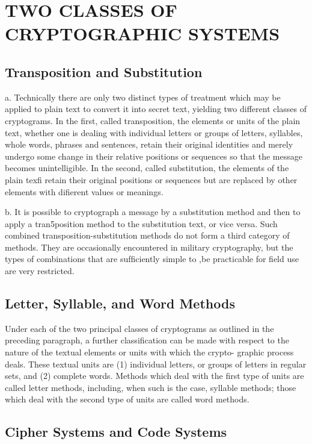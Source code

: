 \section{TWO CLASSES OF CRYPTOGRAPHIC SYSTEMS}

\subsection{Transposition and Substitution}

a. Technically there are only two distinct types of treatment which
may be applied to plain text to convert it into secret text, yielding two
different classes of cryptograms. In the ﬁrst, called transposition, the
elements or units of the plain text, whether one is dealing with individual
letters or groups of letters, syllables, whole words, phrases and sentences,
retain their original identities and merely undergo some change in their
relative positions or sequences so that the message becomes unintelligible.
In the second, called substitution, the elements of the plain texﬁ retain
their original positions or sequences but are replaced by other elements
with diﬁerent values or meanings.

b. It is possible to cryptograph a message by a substitution method
and then to apply a tran5position method to the substitution text, or vice
versa. Such combined transposition-substitution methods do not form a
third category of methods. They are occasionally encountered in military
cryptography, but the types of combinations that are sufﬁciently simple to
,be practicable for ﬁeld use are very restricted.

\subsection{Letter, Syllable, and Word Methods}

Under each of the two principal classes of cryptograms as outlined in
the preceding paragraph, a further classiﬁcation can be made with respect
to the nature of the textual elements or units with which the crypto-
graphic process deals. These textual units are (1) individual letters, or
groups of letters in regular sets, and (2) complete words. Methods which
deal with the ﬁrst type of units are called letter methods, including, when
such is the case, syllable methods; those which deal with the second type
of units are called word methods.

\subsection{Cipher Systems and Code Systems}

